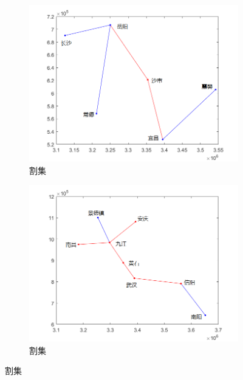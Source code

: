 \documentclass{article}
\begin{document}
\begin{figure}[htpb]
	\centering
	\begin{subfigure}[htpb]{.45\linewidth}
		\centering
		\includegraphics[width=\linewidth]{310.png}
		\caption{割集}
		\label{fig:割集\chinese{subfigure}}
	\end{subfigure}
	\quad
	\begin{subfigure}[htpb]{.45\linewidth}
		\centering
		\includegraphics[width=\linewidth]{320.png}
		\caption{割集}
		\label{fig:割集\chinese{subfigure}}
	\end{subfigure}
	\caption{割集}
	\label{fig:割集}
\end{figure}
\end{document}

